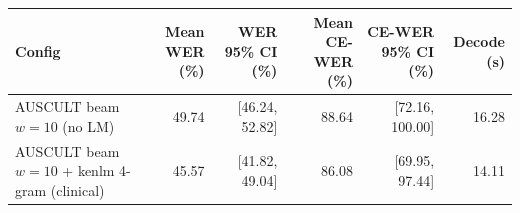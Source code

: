 \begin{tabular}{lrrrrr}
\toprule
Config & Mean WER (\%) & WER 95\% CI (\%) & Mean CE-WER (\%) & CE-WER 95\% CI (\%) & Decode (s) \\
\midrule
AUSCULT beam $w=10$ (no LM) & 49.74 & [46.24, 52.82] & 88.64 & [72.16, 100.00] & 16.28 \\
AUSCULT beam $w=10$ + kenlm 4-gram (clinical) & 45.57 & [41.82, 49.04] & 86.08 & [69.95, 97.44] & 14.11 \\
\bottomrule
\end{tabular}
